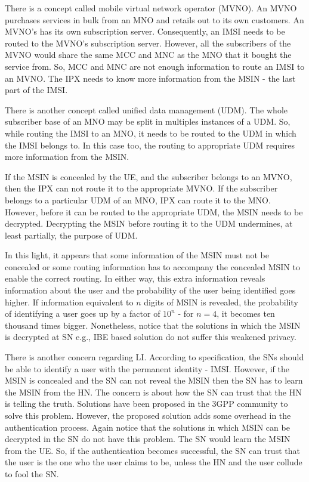 \documentclass[conference]{IEEEtran}
\begin{document}
There is a concept called mobile virtual network operator (MVNO). An MVNO purchases services in bulk from an MNO and retails out to its own customers. An MVNO's has its own subscription server. Consequently, an IMSI needs to be routed to the MVNO's subscription server. However, all the subscribers of the MVNO would share the same MCC and MNC as the MNO that it bought the service from. So, MCC and MNC are not enough information to route an IMSI to an MVNO. The IPX needs to know more information from the MSIN - the last part of the IMSI.

There is another concept called unified data management (UDM). The whole subscriber base of an MNO may be split in multiples instances of a UDM. So, while routing the IMSI to an MNO, it needs to be routed to the UDM in which the IMSI belongs to. In this case too, the routing to appropriate UDM requires more information from the MSIN.

If the MSIN is concealed by the UE, and the subscriber belongs to an MVNO, then the IPX can not route it to the appropriate MVNO. If the subscriber belongs to a particular UDM of an MNO, IPX can route it to the MNO. However, before it can be routed to the appropriate UDM, the MSIN needs to be decrypted. Decrypting the MSIN before routing it to the UDM undermines, at least partially, the purpose of UDM.

In this light, it appears that some information of the MSIN must not be concealed or some routing information has to accompany the concealed MSIN to enable the correct routing. In either way, this extra information reveals information about the user and the probability of the user being identified goes higher. If information equivalent to $n$ digits of MSIN is revealed, the probability of identifying a user goes up by a factor of $10^n$ - for $n=4$, it becomes ten thousand times bigger. Nonetheless, notice that the solutions in which the MSIN is decrypted at SN e.g., IBE based solution do not suffer this weakened privacy.

There is another concern regarding LI. According to specification, the SNs should be able to identify a user with the permanent identity - IMSI. However, if the MSIN is concealed and the SN can not reveal the MSIN then the SN has to learn the MSIN from the HN. The concern is about how the SN can trust that the HN is telling the truth. Solutions have been proposed in the 3GPP community to solve this problem. However, the proposed solution adds some overhead in the authentication process. Again notice that the solutions in which MSIN can be decrypted in the SN do not have this problem. The SN would learn the MSIN from the UE. So, if the authentication becomes successful, the SN can trust that the user is the one who the user claims to be, unless the HN and the user collude to fool the SN.
\end{document}

